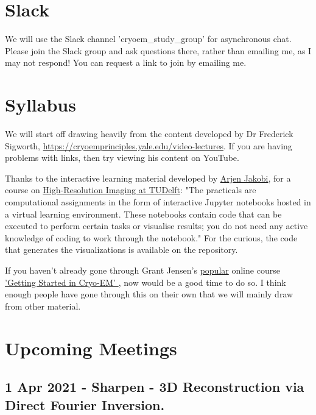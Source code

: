 \documentclass[11pt, oneside]{article}   	%
\begin{document}
\section{Slack}
We will use the Slack channel 'cryoem\_study\_group' for asynchronous chat. Please join the Slack group and ask questions there, rather than emailing me, as I may not respond! You can request a link to join by emailing me.


\section{Syllabus}
We will start off drawing heavily from the content developed by Dr Frederick Sigworth, \url{https://cryoemprinciples.yale.edu/video-lectures}. If you are having problems with links, then try viewing his content on YouTube.

Thanks to the interactive learning material developed by \href{http://cryoem.tudelft.nl/group/arjen-jakobi/}{Arjen Jakobi}, for a course on \href{https://gitlab.tudelft.nl/aj-lab/teaching/-/wikis/NB4020}{High-Resolution Imaging at TUDelft}: "The practicals are computational assignments in the form of interactive Jupyter notebooks hosted in a virtual learning environment. These notebooks contain code that can be executed to perform certain tasks or visualise results; you do not need any active knowledge of coding to work through the notebook." For the curious, the code that generates the visualizations is available on the repository.

If you haven't already gone through Grant Jensen's \href{https://www.caltech.edu/about/news/grant-jensen-cryo-em}{popular} online course \href{https://jensenlab.caltech.edu/courses/}{'Getting Started in Cryo-EM' }, now would be a good time to do so. I think enough people have gone through this on their own that we will mainly draw from other material. 

\pagebreak
\section{Upcoming Meetings}

\pagebreak
\subsection{1 Apr 2021 - Sharpen - 3D Reconstruction via Direct Fourier Inversion.}
\end{document}
